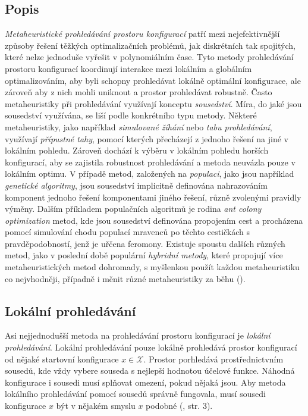 \subsection{Popis}

\textit{Metaheuristické prohledávání prostoru konfigurací} patří mezi nejefektivnější způsoby řešení těžkých optimalizačních problémů,
jak diskrétních tak spojitých,
které nelze jednoduše vyřešit v polynomiálním čase.
Tyto metody prohledávání prostoru konfigurací koordinují interakce mezi lokálním a globálním optimalizováním,
aby byli schopny prohledávat lokálně optimální konfigurace, ale zároveň aby z nich mohli uniknout a prostor prohledávat robustně.
Často metaheuristiky při prohledávání využívají konceptu \textit{sousedství}.
Míra, do jaké jsou sousedství využívána, se liší podle konkrétního typu metody.
Některé metaheuristiky, jako například \textit{simulované žíhání} nebo \textit{tabu prohledávání}, využívají \textit{přípustné tahy},
pomocí kterých přecházejí z jednoho řešení na jiné v lokálním pohledu.
Zároveň dochází k výběru v lokálním pohledu horších konfigurací, aby se zajistila robustnost prohledávání
a metoda neuvázla pouze v lokálním optimu.
V případě metod, založených na \textit{populaci}, jako jsou například \textit{genetické algoritmy}, jsou sousedství implicitně definována
nahrazováním komponent jednoho řešení komponentami jiného řešení, různě zvolenými pravidly výměny.
Dalším příkladem populačních algoritmů je rodina \textit{ant colony optimization} metod,
kde jsou sousedství definována propojením cest a procházena pomocí simulování chodu populací mravenců po těchto cestičkách
s pravděpodobností, jenž je uřčena feromony.
Existuje spoustu dalších různých metod, jako v poslední době populární \textit{hybridní metody},
které propojují více metaheuristických metod dohromady, s myšlenkou použít každou metaheuristiku co nejvhodněji,
případně i měnit různé metaheuristiky za běhu (\citet{GlovKoch03}).

\subsection{Lokální prohledávání}

Asi nejjednodušší metoda na prohledávání prostoru konfigurací je \textit{lokální prohledávání}.
Lokální prohledávání pouze lokálně prohledává prostor konfigurací od nějaké startovní konfigurace $x \in \mathcal{X}$. 
Prostor porhledává prostřednictvním sousedů, kde vždy vybere souseda s nejlepší hodnotou účelové funkce.
Náhodná konfigurace i sousedi musí splňovat omezení, pokud nějaká jsou.
Aby metoda lokálního prohledávání pomocí sousedů správně fungovala, musí sousedi konfigurace $x$ být v nějakém smyslu $x$ podobné (\citet{HybridMeta}, str. 3).

